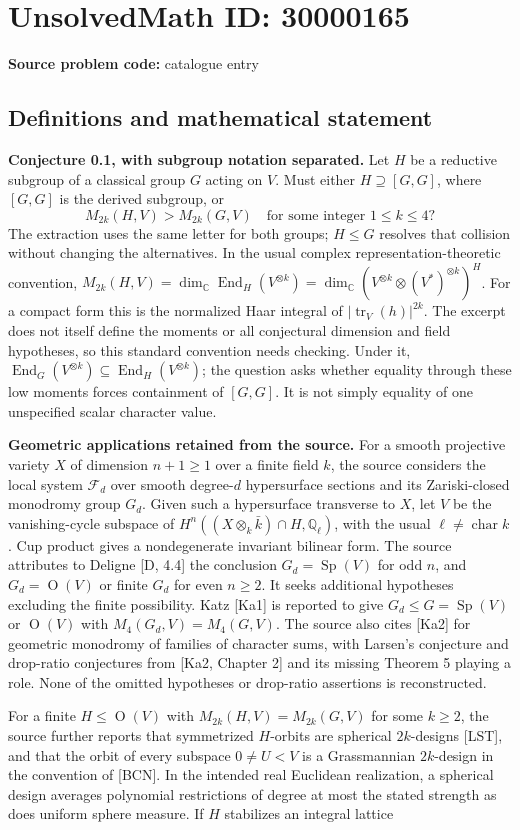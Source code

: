 \documentclass[11pt]{article}
\newcommand{\Q}{\mathbb{Q}}
\newcommand{\C}{\mathbb{C}}
\begin{document}
\section*{UnsolvedMath ID: 30000165}
\textbf{Source problem code:} catalogue entry
\subsection{Definitions and mathematical statement}
\textbf{Conjecture 0.1, with subgroup notation separated.} Let \(H\) be a reductive subgroup of a classical group \(G\) acting on \(V\). Must either \(H\supseteq[G,G]\), where \([G,G]\) is the derived subgroup, or\[M_{2k}(H,V)>M_{2k}(G,V)\quad\text{for some integer }1\le k\le4?\] The extraction uses the same letter for both groups; \(H\le G\) resolves that collision without changing the alternatives. In the usual complex representation-theoretic convention, \(M_{2k}(H,V)=\dim_{\C}\operatorname{End}_H(V^{\otimes k})=\dim_{\C}(V^{\otimes k}\otimes(V^*)^{\otimes k})^H\). For a compact form this is the normalized Haar integral of \(|\operatorname{tr}_V(h)|^{2k}\). The excerpt does not itself define the moments or all conjectural dimension and field hypotheses, so this standard convention needs checking. Under it, \(\operatorname{End}_G(V^{\otimes k})\subseteq\operatorname{End}_H(V^{\otimes k})\); the question asks whether equality through these low moments forces containment of \([G,G]\). It is not simply equality of one unspecified scalar character value.\par \textbf{Geometric applications retained from the source.} For a smooth projective variety \(X\) of dimension \(n+1\ge1\) over a finite field \(k\), the source considers the local system \(\mathcal F_d\) over smooth degree-\(d\) hypersurface sections and its Zariski-closed monodromy group \(G_d\). Given such a hypersurface transverse to \(X\), let \(V\) be the vanishing-cycle subspace of \(H^n((X\otimes_k\bar k)\cap H,\Q_\ell)\), with the usual \(\ell\ne\operatorname{char}k\). Cup product gives a nondegenerate invariant bilinear form. The source attributes to Deligne [D, 4.4] the conclusion \(G_d=\operatorname{Sp}(V)\) for odd \(n\), and \(G_d=\operatorname{O}(V)\) or finite \(G_d\) for even \(n\ge2\). It seeks additional hypotheses excluding the finite possibility. Katz [Ka1] is reported to give \(G_d\le G=\operatorname{Sp}(V)\) or \(\operatorname{O}(V)\) with \(M_4(G_d,V)=M_4(G,V)\). The source also cites [Ka2] for geometric monodromy of families of character sums, with Larsen's conjecture and drop-ratio conjectures from [Ka2, Chapter 2] and its missing Theorem 5 playing a role. None of the omitted hypotheses or drop-ratio assertions is reconstructed.\par For a finite \(H\le\operatorname{O}(V)\) with \(M_{2k}(H,V)=M_{2k}(G,V)\) for some \(k\ge2\), the source further reports that symmetrized \(H\)-orbits are spherical \(2k\)-designs [LST], and that the orbit of every subspace \(0\ne U<V\) is a Grassmannian \(2k\)-design in the convention of [BCN]. In the intended real Euclidean realization, a spherical design averages polynomial restrictions of degree at most the stated strength as does uniform sphere measure. If \(H\) stabilizes an integral lattice 
\end{document}
